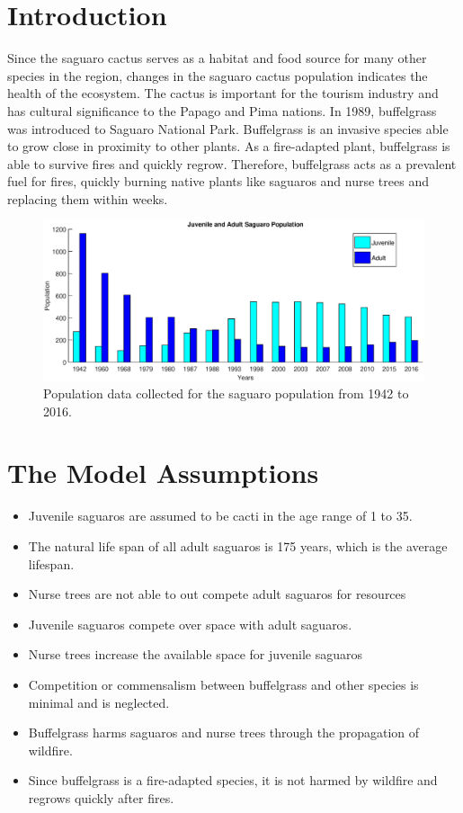 \documentclass[size=custom,width=48 in,height=42 in, landscape]{sciposter}
\begin{document}
\begin{multicols}{3}
\section{Introduction}
Since the saguaro cactus serves as a habitat and food source for many other species in the region, changes in the saguaro cactus population indicates the health of the  ecosystem. The cactus is important for the tourism industry and has cultural significance to the Papago and Pima nations. In 1989, buffelgrass was introduced to Saguaro National Park. Buffelgrass is an invasive species able to grow close in proximity to other plants. As a fire-adapted plant, buffelgrass is able to survive fires and quickly regrow. Therefore, buffelgrass acts as a prevalent fuel for fires, quickly burning native plants like saguaros and nurse trees and replacing them within weeks. \\

\vspace{-1cm}
\begin{figure}
\centering
\includegraphics[trim={1.5cm 0 3cm 0},clip,scale = .8]{sagpop.eps}
\tiny{\caption{Population data collected for the saguaro population from 1942 to 2016.}}
\end{figure}
\vspace{-1.5cm}
\section{The Model Assumptions}
\small{
\begin{itemize}
\itemsep0em 
\item Juvenile saguaros are assumed to be cacti in the age range of 1 to 35.
\item The natural life span of all adult saguaros is 175 years, which is the average lifespan.
\item Nurse trees are not able to out compete adult saguaros for resources
\item Juvenile saguaros compete over space with adult saguaros.
\item Nurse trees increase the available space for juvenile saguaros
\item Competition or commensalism between buffelgrass and other species is minimal and is neglected.
\item Buffelgrass harms saguaros and nurse trees through the propagation of wildfire.
\item Since buffelgrass is a fire-adapted species, it is not harmed by wildfire and regrows quickly after fires.
\end{itemize}}


\end{multicols}
\end{document}

